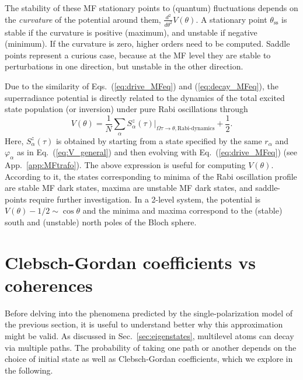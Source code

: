\documentclass[aps,prx,superscriptaddress,twocolumn,notitlepage,nofootinbib,longbibliography]{revtex4-2}
\begin{document}
The stability of these MF stationary points to (quantum) fluctuations depends on the \emph{curvature} of the potential around them, $\frac{d^2}{d\theta^2}V(\theta)$.
A stationary point $\theta_\text{ss}$ is stable if the curvature is positive (maximum), and unstable if negative (minimum). If the curvature is zero, higher orders need to be computed.
Saddle points represent a curious case, because at the MF level they are stable to perturbations in one direction, but unstable in the other direction.


Due to the similarity of Eqs.~(\ref{eq:drive_MFeq}) and (\ref{eq:decay_MFeq}), the superradiance potential is directly related to the dynamics of the total excited state population (or inversion) under pure Rabi oscillations  through
\begin{equation}
	V(\theta) = \frac{1}{N} \sum_\alpha S^z_\alpha(\tau)\Big|_{\Omega\tau \rightarrow \theta, \text{Rabi-dynamics}} + \frac{1}{2}.
\label{eq:relation_VRabi}
\end{equation}
Here, $S^z_\alpha(\tau)$ is obtained by starting from a state specified by the same $r_\alpha$ and $\varphi_\alpha$ as in Eq.~(\ref{eq:V_general}) and then evolving with Eq.~(\ref{eq:drive_MFeq}) (see App.~\ref{app:MFtrafo}).
The above expression is useful for computing $V(\theta)$.
According to it, the states corresponding to minima of the Rabi oscillation profile are stable MF dark states, maxima are unstable MF dark states, and saddle-points require further investigation.
In a 2-level system, the potential is $V(\theta)-1/2\sim \cos \theta$ and the minima and maxima correspond to the (stable) south and (unstable) north poles of the Bloch sphere.







\section{Clebsch-Gordan coefficients vs coherences\label{sec:clebsch_vs_coh}}


Before delving into the phenomena predicted by the single-polarization model of the previous section, it is useful to understand better why this approximation might be valid.
As discussed in Sec.~\ref{sec:eigenstates}, multilevel atoms can decay via multiple paths. The probability of taking one path or another depends on the choice of initial state as well as Clebsch-Gordan coefficients, which we explore in the following.
\end{document}
